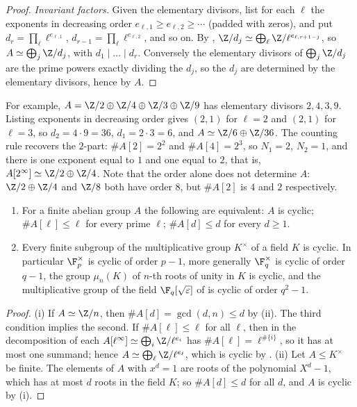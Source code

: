 \begin{proof}
\emph{Invariant factors.} Given the elementary divisors, list for each $\ell$ the exponents in decreasing order $e_{\ell,1}\ge e_{\ell,2}\ge\cdots$ (padded with
zeros), and put $d_r=\prod_\ell\ell^{e_{\ell,1}}$, $d_{r-1}=\prod_\ell\ell^{e_{\ell,2}}$, and so on. By , $\Z/d_j\simeq\bigoplus_\ell\Z/\ell^{e_{\ell,r+1-j}}$, so
$A\simeq\bigoplus_j\Z/d_j$, with $d_1\mid\dots\mid d_r$. Conversely the elementary divisors of $\bigoplus_j\Z/d_j$ are the prime powers exactly dividing the
$d_j$, so the $d_j$ are determined by the elementary divisors, hence by $A$.
\end{proof}

For example, $A=\Z/2\oplus\Z/4\oplus\Z/3\oplus\Z/9$ has elementary divisors $2,4,3,9$. Listing exponents in decreasing order gives $(2,1)$ for $\ell=2$ and $(2,1)$
for $\ell=3$, so $d_2=4\cdot9=36$, $d_1=2\cdot3=6$, and $A\simeq\Z/6\oplus\Z/36$. The counting rule recovers the $2$-part: $\#A[2]=2^2$ and $\#A[4]=2^3$, so
$N_1=2$, $N_2=1$, and there is one exponent equal to $1$ and one equal to $2$, that is, $A[2^\infty]\simeq\Z/2\oplus\Z/4$. Note that the order alone does not
determine $A$: $\Z/2\oplus\Z/4$ and $\Z/8$ both have order $8$, but $\#A[2]$ is $4$ and $2$ respectively.

\begin{corollary}\label{cor:groups:cyclic}
\begin{enumerate}[label=(\roman*)]
\item For a finite abelian group $A$ the following are equivalent: $A$ is cyclic; $\#A[\ell]\le\ell$ for every prime $\ell$; $\#A[d]\le d$ for every $d\ge1$.
\item Every finite subgroup of the multiplicative group $K^\times$ of a field $K$ is cyclic. In particular $\F_p^\times$ is cyclic of order $p-1$, more
generally $\F_q^\times$ is cyclic of order $q-1$, the group $\mu_n(K)$ of $n$-th roots of unity in $K$ is cyclic, and the multiplicative group of the
field $\F_q[\sqrt\varepsilon]$ of  is cyclic of order $q^2-1$.
\end{enumerate}
\end{corollary}

\begin{proof}
(i) If $A\simeq\Z/n$, then $\#A[d]=\gcd(d,n)\le d$ by (ii). The third condition implies the second. If $\#A[\ell]\le\ell$ for all $\ell$, then
in the decomposition of  each $A[\ell^\infty]\simeq\bigoplus_i\Z/\ell^{e_i}$ has $\#A[\ell]=\ell^{\#\{i\}}$, so it has at most one
summand; hence $A\simeq\bigoplus_\ell\Z/\ell^{e_\ell}$, which is cyclic by . (ii) Let $A\le K^\times$ be finite. The elements of $A$ with
$x^d=1$ are roots of the polynomial $X^d-1$, which has at most $d$ roots in the field $K$; so $\#A[d]\le d$ for all $d$, and $A$ is cyclic by (i).
\end{proof}

